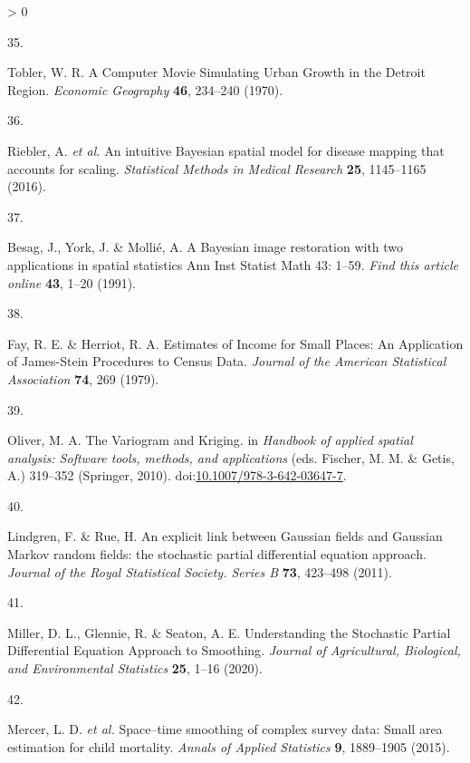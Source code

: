 \documentclass[
]{article}
\newlength{\cslhangindent}
\newlength{\csllabelwidth}
\newenvironment{CSLReferences}[2] %
 {%
  \setlength{\parindent}{0pt}
  \ifodd #1 \everypar{\setlength{\hangindent}{\cslhangindent}}\ignorespaces\fi
  \ifnum #2 > 0
  \setlength{\parskip}{#2\baselineskip}
  \fi
 }%
 {}
\newcommand{\CSLLeftMargin}[1]{\parbox[t]{\csllabelwidth}{#1}}
\newcommand{\CSLRightInline}[1]{\parbox[t]{\linewidth - \csllabelwidth}{#1}\break}
\begin{document}
\begin{CSLReferences}{0}{0}
\leavevmode\hypertarget{ref-Tobler1970}{}%
\CSLLeftMargin{35. }
\CSLRightInline{Tobler, W. R. {A Computer Movie Simulating Urban Growth in the Detroit Region}. \emph{Economic Geography} \textbf{46}, 234--240 (1970).}

\leavevmode\hypertarget{ref-Riebler2016}{}%
\CSLLeftMargin{36. }
\CSLRightInline{Riebler, A. \emph{et al.} {An intuitive Bayesian spatial model for disease mapping that accounts for scaling}. \emph{Statistical Methods in Medical Research} \textbf{25}, 1145--1165 (2016).}

\leavevmode\hypertarget{ref-Besag1991}{}%
\CSLLeftMargin{37. }
\CSLRightInline{Besag, J., York, J. \& Mollié, A. {A Bayesian image restoration with two applications in spatial statistics Ann Inst Statist Math 43: 1--59}. \emph{Find this article online} \textbf{43}, 1--20 (1991).}

\leavevmode\hypertarget{ref-III1979a}{}%
\CSLLeftMargin{38. }
\CSLRightInline{Fay, R. E. \& Herriot, R. A. {Estimates of Income for Small Places: An Application of James-Stein Procedures to Census Data}. \emph{Journal of the American Statistical Association} \textbf{74}, 269 (1979).}

\leavevmode\hypertarget{ref-Oliver2010}{}%
\CSLLeftMargin{39. }
\CSLRightInline{Oliver, M. A. {The Variogram and Kriging}. in \emph{Handbook of applied spatial analysis: Software tools, methods, and applications} (eds. Fischer, M. M. \& Getis, A.) 319--352 (Springer, 2010). doi:\href{https://doi.org/10.1007/978-3-642-03647-7}{10.1007/978-3-642-03647-7}.}

\leavevmode\hypertarget{ref-Lindgren2011}{}%
\CSLLeftMargin{40. }
\CSLRightInline{Lindgren, F. \& Rue, H. {An explicit link between Gaussian fields and Gaussian Markov random fields: the stochastic partial differential equation approach}. \emph{Journal of the Royal Statistical Society. Series B} \textbf{73}, 423--498 (2011).}

\leavevmode\hypertarget{ref-Miller2020}{}%
\CSLLeftMargin{41. }
\CSLRightInline{Miller, D. L., Glennie, R. \& Seaton, A. E. {Understanding the Stochastic Partial Differential Equation Approach to Smoothing}. \emph{Journal of Agricultural, Biological, and Environmental Statistics} \textbf{25}, 1--16 (2020).}

\leavevmode\hypertarget{ref-Mercer2015}{}%
\CSLLeftMargin{42. }
\CSLRightInline{Mercer, L. D. \emph{et al.} {Space--time smoothing of complex survey data: Small area estimation for child mortality}. \emph{Annals of Applied Statistics} \textbf{9}, 1889--1905 (2015).}


\end{CSLReferences}
\end{document}

